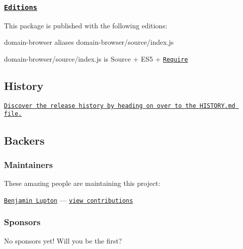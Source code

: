 \subsubsection*{\href{https://github.com/bevry/editions}{\tt Editions}}

This package is published with the following editions\+:


\begin{DoxyItemize}
\item {\ttfamily domain-\/browser} aliases {\ttfamily domain-\/browser/source/index.\+js} 
\item {\ttfamily domain-\/browser/source/index.\+js} is Source + E\+S5 + \href{https://nodejs.org/dist/latest-v5.x/docs/api/modules.html}{\tt Require}
\end{DoxyItemize}

\subsection*{History}

\href{https://github.com/bevry/domain-browser/blob/master/HISTORY.md#files}{\tt Discover the release history by heading on over to the {\ttfamily H\+I\+S\+T\+O\+R\+Y.\+md} file.}

\subsection*{Backers}

\subsubsection*{Maintainers}

These amazing people are maintaining this project\+:


\begin{DoxyItemize}
\item \href{http://balupton.com}{\tt Benjamin Lupton} — \href{https://github.com/bevry/domain-browser/commits?author=balupton}{\tt view contributions}
\end{DoxyItemize}

\subsubsection*{Sponsors}

No sponsors yet! Will you be the first?

\href{https://patreon.com/bevry}{\tt } \href{https://opencollective.com/bevry}{\tt } \href{https://www.gratipay.com/bevry}{\tt } \href{https://flattr.com/profile/balupton}{\tt } \href{https://bevry.me/paypal}{\tt } \href{https://bevry.me/bitcoin}{\tt } \href{https://bevry.me/wishlist}{\tt }

